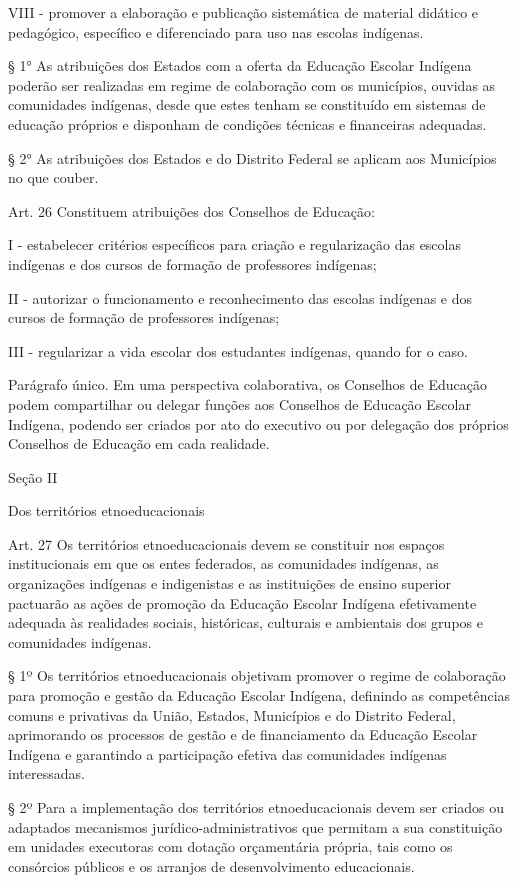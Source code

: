 \documentclass[
]{book}
\begin{document}
VIII - promover a elaboração e publicação sistemática de material didático e pedagógico, específico e diferenciado para uso nas escolas indígenas.

§ 1° As atribuições dos Estados com a oferta da Educação Escolar Indígena poderão ser realizadas em regime de colaboração com os municípios, ouvidas as comunidades indígenas, desde que estes tenham se constituído em sistemas de educação próprios e disponham de condições técnicas e financeiras adequadas.

§ 2° As atribuições dos Estados e do Distrito Federal se aplicam aos Municípios no que couber.

Art. 26 Constituem atribuições dos Conselhos de Educação:

I - estabelecer critérios específicos para criação e regularização das escolas indígenas e dos cursos de formação de professores indígenas;

II - autorizar o funcionamento e reconhecimento das escolas indígenas e dos cursos de formação de professores indígenas;

III - regularizar a vida escolar dos estudantes indígenas, quando for o caso.

Parágrafo único. Em uma perspectiva colaborativa, os Conselhos de Educação podem compartilhar ou delegar funções aos Conselhos de Educação Escolar Indígena, podendo ser criados por ato do executivo ou por delegação dos próprios Conselhos de Educação em cada realidade.

Seção II

Dos territórios etnoeducacionais

Art. 27 Os territórios etnoeducacionais devem se constituir nos espaços institucionais em que os entes federados, as comunidades indígenas, as organizações indígenas e indigenistas e as instituições de ensino superior pactuarão as ações de promoção da Educação Escolar Indígena efetivamente adequada às realidades sociais, históricas, culturais e ambientais dos grupos e comunidades indígenas.

§ 1º Os territórios etnoeducacionais objetivam promover o regime de colaboração para promoção e gestão da Educação Escolar Indígena, definindo as competências comuns e privativas da União, Estados, Municípios e do Distrito Federal, aprimorando os processos de gestão e de financiamento da Educação Escolar Indígena e garantindo a participação efetiva das comunidades indígenas interessadas.

§ 2º Para a implementação dos territórios etnoeducacionais devem ser criados ou adaptados mecanismos jurídico-administrativos que permitam a sua constituição em unidades executoras com dotação orçamentária própria, tais como os consórcios públicos e os arranjos de desenvolvimento educacionais.
\end{document}
